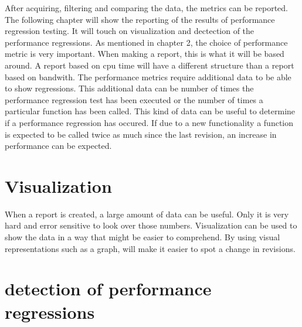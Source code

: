 After acquiring, filtering and comparing the data, the metrics can be reported. The following chapter will show the reporting of the results of performance regression testing. It will touch on visualization and dectection of the performance regressions. \newline
\newline
As mentioned in chapter 2, the choice of performance metric is very important. When making a report, this is what it will be based around. A report based on cpu time will have a different structure than a report based on bandwith. The performance metrics require additional data to be able to show regressions. This additional data can be number of times the performance regression test has been executed or the number of times a particular function has been called. This kind of data can be useful to determine if a performance regression has occured. If due to a new functionality a function is expected to be called twice as much since the last revision, an increase in performance can be expected.\newline

\section{Visualization}
When a report is created, a large amount of data can be useful. Only it is very hard and error sensitive to look over those numbers. Visualization can be used to show the data in a way that might be easier to comprehend. By using visual representations such as a graph, will make it easier to spot a change in revisions.

\section{detection of performance regressions}





